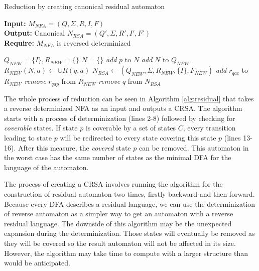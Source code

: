 \begin{algorithm}
\caption{Reduction by creating canonical residual automaton} \label{alg:residual}
 \hspace*{\algorithmicindent} \textbf{Input: } $M_{NFA}=(Q,\Sigma,R,I,F)$\\
 \hspace*{\algorithmicindent} \textbf{Output:}  Canonical $N_{RSA}=(Q',\Sigma,R',I',F')$ \\
 \hspace*{\algorithmicindent} \textbf{Require:}  $M_{NFA}$ is reversed determinized 
\begin{algorithmic}[1]
\LState $Q_{NEW} = \{I\}, R_{NEW} = \{\}$
    \LState $N = \{\}$
        \LState \textit{add} $p$ to $N$
    \popindent\EndFor
        \LState \textit{add} $N$ to $Q_{NEW}$
        \LState $R_{NEW}(N,a) \gets \cup R(q,a)$
    \popindent\EndIf
\popindent\EndFor
\LState $N_{RSA} \gets (Q_{NEW}, \Sigma, R_{NEW}, \{I\}, F_{NEW})$
                    \LState \textit{add} $r_{qac}$ to $R_{NEW}$
                    \popindent\EndFor
                \LState \textit{remove} $r_{qap} $ from $ R_{NEW}$
            \popindent\EndFor
            \LState \textit{remove} $q$ from $N_{RSA}$
        \popindent\EndIf
    \popindent\EndFor
\popindent\EndFor
\end{algorithmic}
\end{algorithm}

The whole process of reduction can be seen in Algorithm \ref{alg:residual} that takes a reverse determinized NFA as an input and outputs a CRSA. The algorithm starts with a process of determinization (lines 2-8) followed by checking for \textit{coverable} states. If state $p$ is coverable by a set of states $C$, every transition leading to state $p$ will be redirected to every state covering this state $p$ (lines 13-16). After this measure, the \textit{covered} state $p$ can be removed. This automaton in the worst case has the same number of states as the minimal DFA for the language of the automaton.

The process of creating a CRSA involves running the algorithm for the construction of residual automaton two times, firstly backward and then forward. Because every DFA describes a residual language, we can use the determinization of reverse automaton as a simpler way to get an automaton with a reverse residual language. The downside of this algorithm may be the unexpected expansion during the determinization. Those states will eventually be removed as they will be covered so the result automaton will not be affected in its size. However, the algorithm may take time to compute with a larger structure than would be anticipated.

